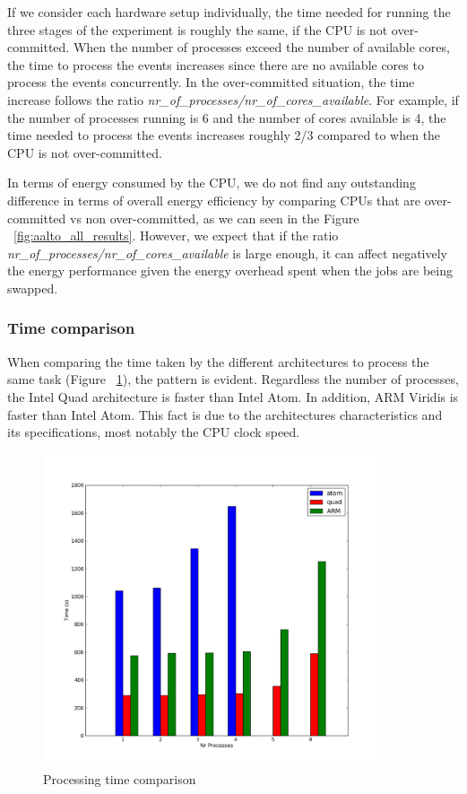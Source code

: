 If we consider each hardware setup individually, the time needed for running the three stages of the experiment is roughly the same, if the CPU is not over-committed. When
the number of processes exceed the number of available cores, the time to 
process the events increases since there are no available cores to process the
events concurrently. In the over-committed situation, the time increase follows
the ratio \textit{nr\_of\_processes/nr\_of\_cores\_available}. 
For example, if the
number of processes running is 6 and the number of cores available is 4, the
time needed to process the events increases roughly 2/3 compared to when the
CPU is not over-committed.

In terms of energy consumed by the CPU, we do not find any outstanding difference in terms of overall energy efficiency by comparing CPUs that are over-committed vs non over-committed, as we can seen in the Figure ~\ref{fig:aalto_all_results}. However, we expect that if the ratio \textit{nr\_of\_processes/nr\_of\_cores\_available} is large enough, it can affect negatively the energy performance given the energy overhead spent when the jobs are being swapped.


\subsubsection*{Time comparison}
When comparing the time taken by the different architectures to process the same
task (Figure ~\ref{fig:aalto_time}), the pattern is evident. 
Regardless the number of processes, the 
Intel Quad architecture is faster than Intel Atom. In addition, ARM Viridis is faster than Intel Atom.
This fact is due to the architectures characteristics and its specifications, most notably the CPU clock speed.\\

\begin{figure}[h]
  \centering
    \includegraphics[width=100mm]{"img/aalto/aalto_all_time"}
    \caption{Processing time comparison}
    \label{fig:aalto_time}
\end{figure}


